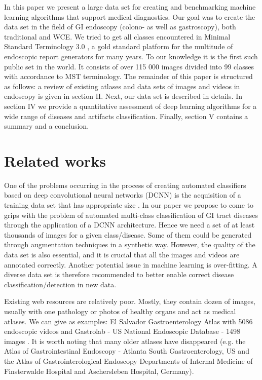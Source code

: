 \documentclass[preprint]{article}
\begin{document}
In this paper we present a large data set for creating and benchmarking machine learning algorithms that support medical diagnostics. Our goal was to create the data set in the field of GI endoscopy (colono- as well as gastroscopy), both traditional and WCE. We tried to get all classes encountered in Minimal Standard Terminology 3.0 \cite{MST}, a gold standard platform for the multitude of endoscopic report generators for many years.
To our knowledge it is the first such public set in the world.
It consists of over 115 000 images divided into 99 classes with accordance to MST terminology.
The remainder of this paper is structured as follows:  a review of existing atlases and data sets of images and videos in endoscopy is given in section II. Next, our data set is described in details. In section IV we provide a quantitative assessment of deep learning algorithms for a wide range of diseases and artifacts classification. Finally, section V contains a summary and a conclusion.

\section{Related works}

One of the problems occurring in the process of creating automated classifiers based on deep convolutional neural networks (DCNN) is the acquisition of a training data set that has appropriate size \cite{Litjens2017}. In our paper we propose to come to grips with the problem of automated multi-class classification of GI tract diseases through the application of a DCNN architecture. Hence we need a set of at least thousands of images for a given class/disease. Some of them could be generated through augmentation techniques in a synthetic way. However, the quality of the data set is also essential, and it is crucial that all the images and videos are annotated correctly. Another potential issue in machine learning is over-fitting. A diverse data set is therefore recommended to better enable correct disease classification/detection in new data.

Existing web resources are relatively poor. Mostly, they contain dozen of images, usually with one pathology or photos of healthy organs and act as medical atlases. We can give as examples: El Salvador Gastroenterology Atlas with 5086 endoscopic videos \cite{atlas1} and  Gastrolab - US National Endoscopic Database - 1498 images \cite{atlas3}. It is worth noting that many older atlases have disappeared (e.g. the Atlas of Gastrointestinal Endoscopy - Atlanta South Gastroenterology, US and the Atlas of Gastrointerological Endoscopy Departments of Internal Medicine of Finsterwalde Hospital and Aschersleben Hospital, Germany).
\end{document}

